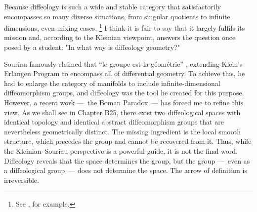Because diffeology is such a wide and stable category that satisfactorily encompasses so many diverse situations,
from singular quotients to infinite dimensions,
even mixing cases,%
\footnote{See \cite{PIZ16},
for example.}
I think it is fair to say that it largely fulfils its mission and,
according to the Kleinian viewpoint,
answers the question once posed by a student:
"In what way is diffeology geometry?"

Souriau famously claimed that ``le groupe est la géométrie'' \cite{Sou03},
extending Klein's Erlangen Program to encompass all of differential geometry.
To achieve this,
he had to enlarge the category of manifolds to include infinite-dimensional diffeomorphism groups,
and diffeology was the tool he created for this purpose.
However,
a recent work
---~the Boman Paradox~---
has forced me to refine this view.
As we shall see in Chapter B25,
there exist two diffeological spaces with identical topology and identical abstract diffeomorphism groups
that are nevertheless geometrically distinct.
The missing ingredient is the local smooth structure,
which precedes the group and cannot be recovered from it.
Thus, while the Kleinian--Souriau perspective is a powerful guide,
it is not the final word.
Diffeology reveals that the space determines the group,
but the group
---~even as a diffeological group~---
does not determine the space.
The arrow of definition is irreversible.
